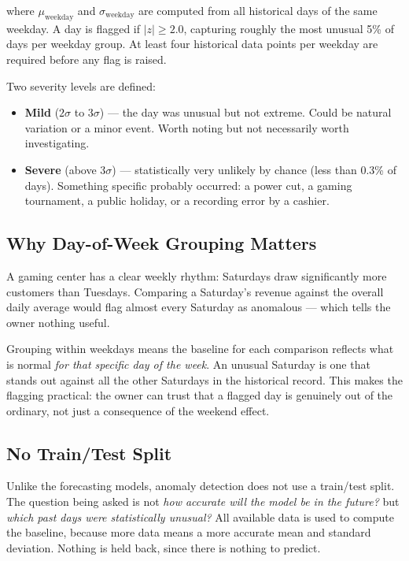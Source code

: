 where $\mu_{\text{weekday}}$ and $\sigma_{\text{weekday}}$ are computed from all
historical days of the same weekday. A day is flagged if $|z| \geq 2.0$, capturing
roughly the most unusual 5\% of days per weekday group. At least four historical
data points per weekday are required before any flag is raised.

Two severity levels are defined:

\begin{itemize}
  \item \textbf{Mild} ($2\sigma$ to $3\sigma$) --- the day was unusual but not
        extreme. Could be natural variation or a minor event. Worth noting but not
        necessarily worth investigating.
  \item \textbf{Severe} (above $3\sigma$) --- statistically very unlikely by chance
        (less than 0.3\% of days). Something specific probably occurred: a power
        cut, a gaming tournament, a public holiday, or a recording error by a cashier.
\end{itemize}

\subsection{Why Day-of-Week Grouping Matters}

A gaming center has a clear weekly rhythm: Saturdays draw significantly more customers
than Tuesdays. Comparing a Saturday's revenue against the overall daily average would
flag almost every Saturday as anomalous --- which tells the owner nothing useful.

Grouping within weekdays means the baseline for each comparison reflects what is normal
\textit{for that specific day of the week}. An unusual Saturday is one that stands out
against all the other Saturdays in the historical record. This makes the flagging
practical: the owner can trust that a flagged day is genuinely out of the ordinary,
not just a consequence of the weekend effect.

\subsection{No Train/Test Split}

Unlike the forecasting models, anomaly detection does not use a train/test split. The
question being asked is not \textit{how accurate will the model be in the future?} but
\textit{which past days were statistically unusual?} All available data is used to
compute the baseline, because more data means a more accurate mean and standard
deviation. Nothing is held back, since there is nothing to predict.


